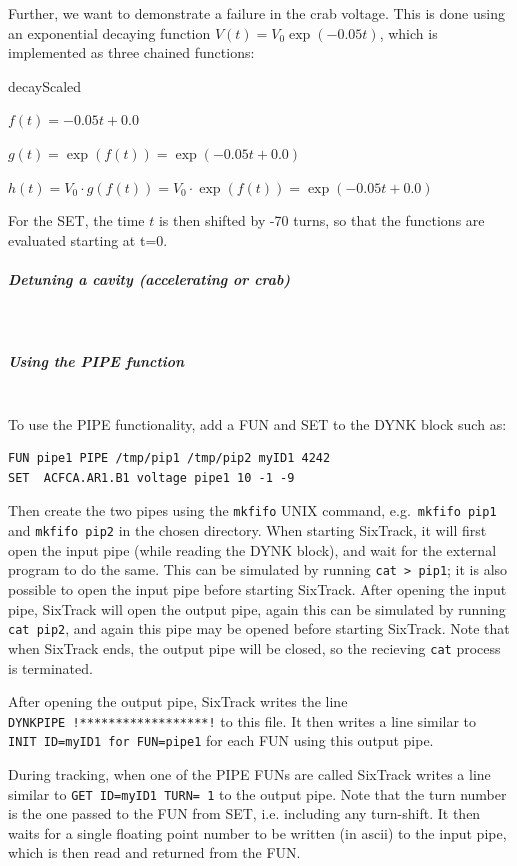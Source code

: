 \documentclass[a4paper,11pt]{report}
\newenvironment{description_alligned}[1]
{\begin{list}{}%
    {\renewcommand\makelabel[1]{##1:\hfill}%
      \settowidth\labelwidth{\makelabel{#1}}%
      \setlength\leftmargin{\labelwidth}
      \addtolength\leftmargin{\labelsep}}}
  {\end{list}}
\begin{document}
Further, we want to demonstrate a failure in the crab voltage.
This is done using an exponential decaying function $V(t) = V_0 \exp\left(-0.05 t\right)$, which is implemented as three chained functions:
\begin{description_alligned}{decayScaled}
\item[expCore] $f(t) = -0.05 t + 0.0$
\item[decay] $g(t) = \exp(f(t)) = \exp(-0.05 t + 0.0)$
\item[decayScaled] $h(t) = V_0 \cdot g(f(t)) = V_0 \cdot \exp(f(t)) = \exp(-0.05 t + 0.0)$
\end{description_alligned}
For the SET, the time $t$ is then shifted by -70 turns, so that the functions are evaluated starting at t=0.

\subparagraph{Detuning a cavity (accelerating or crab)}~\\

\subparagraph{Using the PIPE function}~\\

To use the PIPE functionality, add a FUN and SET to the DYNK block such as:
\begin{verbatim}
FUN pipe1 PIPE /tmp/pip1 /tmp/pip2 myID1 4242
SET  ACFCA.AR1.B1 voltage pipe1 10 -1 -9
\end{verbatim}
Then create the two pipes using the \texttt{mkfifo} UNIX command, e.g.\ \texttt{mkfifo~pip1} and \texttt{mkfifo~pip2} in the chosen directory.
When starting SixTrack, it will first open the input pipe (while reading the DYNK block), and wait for the external program to do the same.
This can be simulated by running \texttt{cat~>~pip1}; it is also possible to open the input pipe before starting SixTrack.
After opening the input pipe, SixTrack will open the output pipe, again this can be simulated by running \texttt{cat~pip2}, and again this pipe may be opened before starting SixTrack.
Note that when SixTrack ends, the output pipe will be closed, so the recieving \texttt{cat} process is terminated.

After opening the output pipe, SixTrack writes the line \texttt{DYNKPIPE~!******************!} to this file.
It then writes a line similar to \texttt{INIT~ID=myID1~for~FUN=pipe1} for each FUN using this output pipe.

During tracking, when one of the PIPE FUNs are called SixTrack writes a line similar to \texttt{GET ID=myID1 TURN=~1} to the output pipe.
Note that the turn number is the one passed to the FUN from SET, i.e. including any turn-shift.
It then waits for a single floating point number to be written (in ascii) to the input pipe, which is then read and returned from the FUN.
\end{document}
